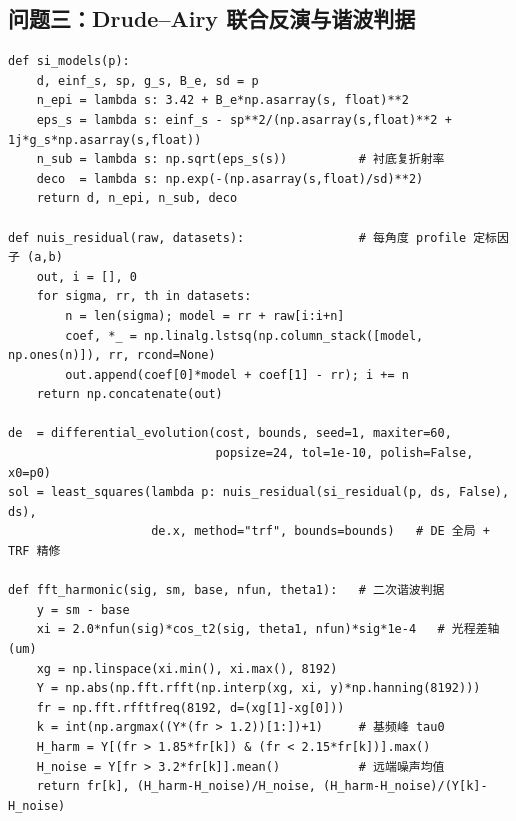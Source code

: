 \documentclass[11pt,a4paper,fontset=fandol]{ctexart}
\begin{document}
\subsection{问题三：Drude--Airy 联合反演与谐波判据}
\begin{lstlisting}
def si_models(p):
    d, einf_s, sp, g_s, B_e, sd = p
    n_epi = lambda s: 3.42 + B_e*np.asarray(s, float)**2
    eps_s = lambda s: einf_s - sp**2/(np.asarray(s,float)**2 + 1j*g_s*np.asarray(s,float))
    n_sub = lambda s: np.sqrt(eps_s(s))          # 衬底复折射率
    deco  = lambda s: np.exp(-(np.asarray(s,float)/sd)**2)
    return d, n_epi, n_sub, deco

def nuis_residual(raw, datasets):                # 每角度 profile 定标因子 (a,b)
    out, i = [], 0
    for sigma, rr, th in datasets:
        n = len(sigma); model = rr + raw[i:i+n]
        coef, *_ = np.linalg.lstsq(np.column_stack([model, np.ones(n)]), rr, rcond=None)
        out.append(coef[0]*model + coef[1] - rr); i += n
    return np.concatenate(out)

de  = differential_evolution(cost, bounds, seed=1, maxiter=60,
                             popsize=24, tol=1e-10, polish=False, x0=p0)
sol = least_squares(lambda p: nuis_residual(si_residual(p, ds, False), ds),
                    de.x, method="trf", bounds=bounds)   # DE 全局 + TRF 精修

def fft_harmonic(sig, sm, base, nfun, theta1):   # 二次谐波判据
    y = sm - base
    xi = 2.0*nfun(sig)*cos_t2(sig, theta1, nfun)*sig*1e-4   # 光程差轴 (um)
    xg = np.linspace(xi.min(), xi.max(), 8192)
    Y = np.abs(np.fft.rfft(np.interp(xg, xi, y)*np.hanning(8192)))
    fr = np.fft.rfftfreq(8192, d=(xg[1]-xg[0]))
    k = int(np.argmax((Y*(fr > 1.2))[1:])+1)     # 基频峰 tau0
    H_harm = Y[(fr > 1.85*fr[k]) & (fr < 2.15*fr[k])].max()
    H_noise = Y[fr > 3.2*fr[k]].mean()           # 远端噪声均值
    return fr[k], (H_harm-H_noise)/H_noise, (H_harm-H_noise)/(Y[k]-H_noise)
\end{lstlisting}
\end{document}
